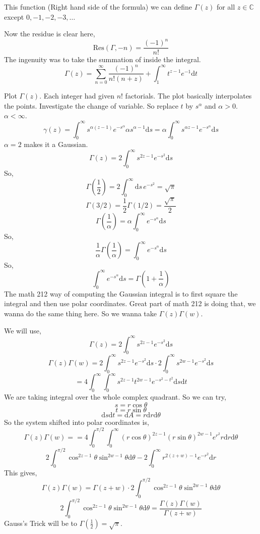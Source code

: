 \documentclass[letter]{article}
\begin{document}
This function (Right hand side of the formula) we can define $\Gamma (z)$ for all $z \in  \mathbb{C}$ except $0, -1, -2, -3, \ldots$

Now the residue is clear here, 
\[
\text{Res}(\Gamma, -n) = \frac{(-1)^{n}}{n!}
\] 
The ingenuity was to take the summation of inside the integral.  
\[
\Gamma (z) = \sum_{n=0}^{\infty} \frac{(-1)^{n} }{n! (n+z) } 
+ 
\int_1^{\infty} t ^{z-1} e ^{-1} \mathrm{d} t
\]

Plot $\Gamma(z)$. Each integer had given $n!$ factorials. The plot basically interpolates the points. Investigate the change of variable. So replace $t$ by $s ^{ \alpha}$ and $\alpha > 0$. $\alpha < \infty$. 
\[
\gamma(z) = 
\int_0^{\infty} s ^{\alpha (z-1)} e^{ - s^{\alpha}} \alpha s ^{\alpha - 1} \mathrm{d}  s = 
\alpha \int_0^{\infty} s^{ \alpha z -1 } e^{ - s ^{\alpha}}\mathrm{d}  s
\]
$\alpha = 2$ makes it a Gaussian. 
\[
	\Gamma(z) = 2 \int_0^{\infty} s^{2z - 1} e^{-s ^2} \mathrm{d} s
\]
So, 
\[
\Gamma(\frac{1}{2}) = 2 
\int_0^{\infty} \mathrm{d}  s\, e^{ -s ^2}  = \sqrt{\pi } 
\]
\[
\Gamma(3 / 2) = \frac{1}{2} \Gamma({1} / {2}) = \frac{\sqrt{ \pi } }{2}
\]
\[
\Gamma(\frac{1}{\alpha}) = \alpha \int_0^{\infty} e^{-s ^{\alpha}} \mathrm{d}  s
\]
So, 
\[
\frac{1}{\alpha} \Gamma ( \frac{1}{\alpha}) = \int_0^{\infty} e ^{-s ^{\alpha}} \mathrm{d}  s
\]
So, 
\[
\int_0^{\infty} e^{-s ^{\alpha}} \mathrm{d} s = \Gamma(1 + \frac{1}{\alpha})
\] 
The math 212 way of computing the Gaussian integral is to first square the integral and then use polar coordinates. Great part of math 212 is doing that, we wanna do the same thing here. 
So we wanna take $\Gamma (z) \Gamma (w)$. 

We will use,
\[
\Gamma(z) = 2 \int_0^{\infty} s ^{2z - 1} e^{ - s ^2} \mathrm{d}  s
\] 
\[
\Gamma(z) \Gamma(w) = 
2 \int_0^{\infty} s ^{2z - 1} e^{ - s ^2} \mathrm{d}  s
\cdot
2 \int_0^{\infty} s ^{2w - 1} e^{ - s ^2} \mathrm{d}  s
\] 
\[
= 4 \int_0^{\infty} \int_0^{\infty} s^{2z-1}t ^{2w-1} e^{-s^2 -t^2} \mathrm{d} s \mathrm{d} t
\]
We are taking integral over the whole complex quadrant. So we can try, 
\[
s = r \cos \theta
\] 
\[
t = r \sin \theta
\] 
\[
\mathrm{d} s \mathrm{d} t = \mathrm{d} A = r \mathrm{d} r \mathrm{d} \theta
\] So the system shifted into polar coordinates is, 
\[\Gamma(z) \Gamma(w) = 	
= 4 \int_0^{\pi / 2} \int_0^{\infty}
(r \cos \theta) ^{2 z - 1} 
(r \sin \theta)^{2w - 1} e^{ r ^2} r \mathrm{d} r \mathrm{d} \theta
\]
\[
2 \int_0^{\pi / 2} \cos ^{2z - 1} \theta \sin ^{2w - 1} \theta \mathrm{d} \theta - 
2 \int_0^{\infty} r ^{ 2 (z+w) - 1} e^{-r ^2 } \mathrm{d} r
\]
This gives, 
\[
\Gamma(z) \Gamma(w) = \Gamma(z+w) \cdot 
2 \int_0^{\pi / 2} \cos ^{2z - 1} \theta \sin ^{2w - 1} \theta \mathrm{d} \theta 
\]
\[
2 \int_0^{\pi / 2} \cos ^{2z - 1} \theta \sin ^{2w - 1} \theta \mathrm{d} \theta = 
\frac{\Gamma(z)\Gamma(w)}{\Gamma(z+w)}
\]
Gauss's Trick will be to $\Gamma(\frac{1}{2}) = \sqrt{\pi } $. 
\end{document}
